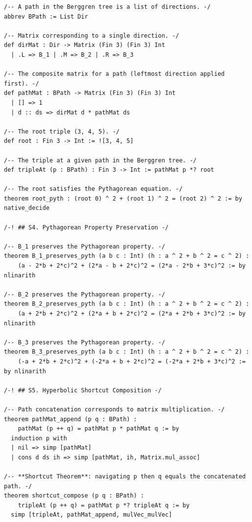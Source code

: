 \documentclass[11pt,openright,twoside]{book}
\theoremstyle{definition}
\begin{document}
\begin{lstlisting}[style=lean]
/-- A path in the Berggren tree is a list of directions. -/
abbrev BPath := List Dir

/-- Matrix corresponding to a single direction. -/
def dirMat : Dir -> Matrix (Fin 3) (Fin 3) Int
  | .L => B_1 | .M => B_2 | .R => B_3

/-- The composite matrix for a path (leftmost direction applied first). -/
def pathMat : BPath -> Matrix (Fin 3) (Fin 3) Int
  | [] => 1
  | d :: ds => dirMat d * pathMat ds

/-- The root triple (3, 4, 5). -/
def root : Fin 3 -> Int := ![3, 4, 5]

/-- The triple at a given path in the Berggren tree. -/
def tripleAt (p : BPath) : Fin 3 -> Int := pathMat p *? root

/-- The root satisfies the Pythagorean equation. -/
theorem root_pyth : (root 0) ^ 2 + (root 1) ^ 2 = (root 2) ^ 2 := by native_decide

/-! ## S4. Pythagorean Property Preservation -/

/-- B_1 preserves the Pythagorean property. -/
theorem B_1_preserves_pyth (a b c : Int) (h : a ^ 2 + b ^ 2 = c ^ 2) :
    (a - 2*b + 2*c)^2 + (2*a - b + 2*c)^2 = (2*a - 2*b + 3*c)^2 := by nlinarith

/-- B_2 preserves the Pythagorean property. -/
theorem B_2_preserves_pyth (a b c : Int) (h : a ^ 2 + b ^ 2 = c ^ 2) :
    (a + 2*b + 2*c)^2 + (2*a + b + 2*c)^2 = (2*a + 2*b + 3*c)^2 := by nlinarith

/-- B_3 preserves the Pythagorean property. -/
theorem B_3_preserves_pyth (a b c : Int) (h : a ^ 2 + b ^ 2 = c ^ 2) :
    (-a + 2*b + 2*c)^2 + (-2*a + b + 2*c)^2 = (-2*a + 2*b + 3*c)^2 := by nlinarith

/-! ## S5. Hyperbolic Shortcut Composition -/

/-- Path concatenation corresponds to matrix multiplication. -/
theorem pathMat_append (p q : BPath) :
    pathMat (p ++ q) = pathMat p * pathMat q := by
  induction p with
  | nil => simp [pathMat]
  | cons d ds ih => simp [pathMat, ih, Matrix.mul_assoc]

/-- **Shortcut Theorem**: navigating p then q equals the concatenated path. -/
theorem shortcut_compose (p q : BPath) :
    tripleAt (p ++ q) = pathMat p *? tripleAt q := by
  simp [tripleAt, pathMat_append, mulVec_mulVec]


\end{lstlisting}
\end{document}
